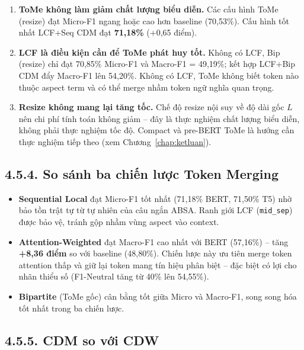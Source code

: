 \begin{enumerate}
  \item \textbf{ToMe không làm giảm chất lượng biểu diễn.}
        Các cấu hình ToMe (resize) đạt Micro-F1 ngang hoặc cao hơn
        baseline (70,53\%). Cấu hình tốt nhất LCF+Seq CDM đạt
        \textbf{71,18\%} (+0,65 điểm).

  \item \textbf{LCF là điều kiện cần để ToMe phát huy tốt.}
        Không có LCF, Bip (resize) chỉ đạt 70,85\% Micro-F1 và Macro-F1
        = 49,19\%; kết hợp LCF+Bip CDM đẩy Macro-F1 lên 54,20\%.
        Không có LCF, ToMe không biết token nào thuộc aspect term và có
        thể merge nhầm token ngữ nghĩa quan trọng.

  \item \textbf{Resize không mang lại tăng tốc.}
        Chế độ resize nội suy về độ dài gốc $L$ nên chi phí tính toán
        không giảm -- đây là thực nghiệm chất lượng biểu diễn, không
        phải thực nghiệm tốc độ. Compact và pre-BERT ToMe là hướng cần
        thực nghiệm tiếp theo (xem Chương~\ref{chap:ketluan}).
\end{enumerate}

\subsection{4.5.4.\; So sánh ba chiến lược Token Merging}

\begin{itemize}
  \item \textbf{Sequential Local} đạt Micro-F1 tốt nhất (71,18\% BERT,
        71,50\% T5) nhờ bảo tồn trật tự từ tự nhiên của câu ngắn ABSA.
        Ranh giới LCF (\texttt{mid\_sep}) được bảo vệ, tránh gộp nhầm
        vùng aspect vào context.

  \item \textbf{Attention-Weighted} đạt Macro-F1 cao nhất với BERT
        (57,16\%) -- tăng \textbf{+8,36 điểm} so với baseline (48,80\%).
        Chiến lược này ưu tiên merge token attention thấp và giữ lại
        token mang tín hiệu phân biệt -- đặc biệt có lợi cho nhãn thiểu
        số (F1-Neutral tăng từ 40\% lên 54,55\%).

  \item \textbf{Bipartite} (ToMe gốc) cân bằng tốt giữa Micro và
        Macro-F1, song song hóa tốt nhất trong ba chiến lược.
\end{itemize}

\subsection{4.5.5.\; CDM so với CDW}

